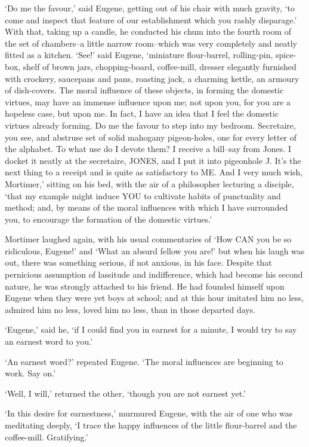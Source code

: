 ‘Do me the favour,’ said Eugene, getting out of his chair with much
gravity, ‘to come and inspect that feature of our establishment which
you rashly disparage.’ With that, taking up a candle, he conducted
his chum into the fourth room of the set of chambers--a little narrow
room--which was very completely and neatly fitted as a kitchen. ‘See!’
said Eugene, ‘miniature flour-barrel, rolling-pin, spice-box, shelf of
brown jars, chopping-board, coffee-mill, dresser elegantly furnished
with crockery, saucepans and pans, roasting jack, a charming kettle, an
armoury of dish-covers. The moral influence of these objects, in forming
the domestic virtues, may have an immense influence upon me; not upon
you, for you are a hopeless case, but upon me. In fact, I have an idea
that I feel the domestic virtues already forming. Do me the favour to
step into my bedroom. Secretaire, you see, and abstruse set of solid
mahogany pigeon-holes, one for every letter of the alphabet. To what use
do I devote them? I receive a bill--say from Jones. I docket it neatly
at the secretaire, JONES, and I put it into pigeonhole J. It’s the next
thing to a receipt and is quite as satisfactory to ME. And I very much
wish, Mortimer,’ sitting on his bed, with the air of a philosopher
lecturing a disciple, ‘that my example might induce YOU to cultivate
habits of punctuality and method; and, by means of the moral influences
with which I have surrounded you, to encourage the formation of the
domestic virtues.’

Mortimer laughed again, with his usual commentaries of ‘How CAN you be
so ridiculous, Eugene!’ and ‘What an absurd fellow you are!’ but when
his laugh was out, there was something serious, if not anxious, in his
face. Despite that pernicious assumption of lassitude and indifference,
which had become his second nature, he was strongly attached to his
friend. He had founded himself upon Eugene when they were yet boys at
school; and at this hour imitated him no less, admired him no less,
loved him no less, than in those departed days.

‘Eugene,’ said he, ‘if I could find you in earnest for a minute, I would
try to say an earnest word to you.’

‘An earnest word?’ repeated Eugene. ‘The moral influences are beginning
to work. Say on.’

‘Well, I will,’ returned the other, ‘though you are not earnest yet.’

‘In this desire for earnestness,’ murmured Eugene, with the air of one
who was meditating deeply, ‘I trace the happy influences of the little
flour-barrel and the coffee-mill. Gratifying.’

